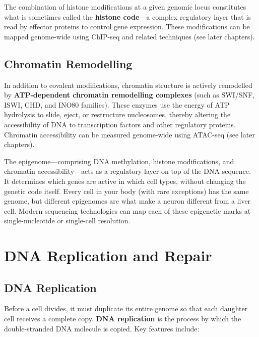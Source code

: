 The combination of histone modifications at a given genomic locus constitutes what is sometimes called the \textbf{histone code}---a complex regulatory layer that is read by effector proteins to control gene expression. These modifications can be mapped genome-wide using \acrshort{ChIP-seq} and related techniques (see later chapters).

\subsection{Chromatin Remodelling}
\label{subsec:molbio:chromatin-remodelling}

In addition to covalent modifications, chromatin structure is actively remodelled by \textbf{ATP-dependent chromatin remodelling complexes} (such as SWI/SNF, ISWI, CHD, and INO80 families). These enzymes use the energy of ATP hydrolysis to slide, eject, or restructure nucleosomes, thereby altering the accessibility of DNA to transcription factors and other regulatory proteins. Chromatin accessibility can be measured genome-wide using \acrshort{ATAC-seq} (see later chapters).

\begin{keyconcept}[title={The Epigenome as a Regulatory Layer}]
The epigenome---comprising DNA methylation, histone modifications, and chromatin accessibility---acts as a regulatory layer on top of the DNA sequence. It determines which genes are active in which cell types, without changing the genetic code itself. Every cell in your body (with rare exceptions) has the same genome, but different epigenomes are what make a neuron different from a liver cell. Modern sequencing technologies can map each of these epigenetic marks at single-nucleotide or single-cell resolution.
\end{keyconcept}


\section{DNA Replication and Repair}
\label{sec:molbio:replication-repair}

\subsection{DNA Replication}
\label{subsec:molbio:replication}

Before a cell divides, it must duplicate its entire genome so that each daughter cell receives a complete copy. \textbf{DNA replication} is the process by which the double-stranded DNA molecule is copied. Key features include:

